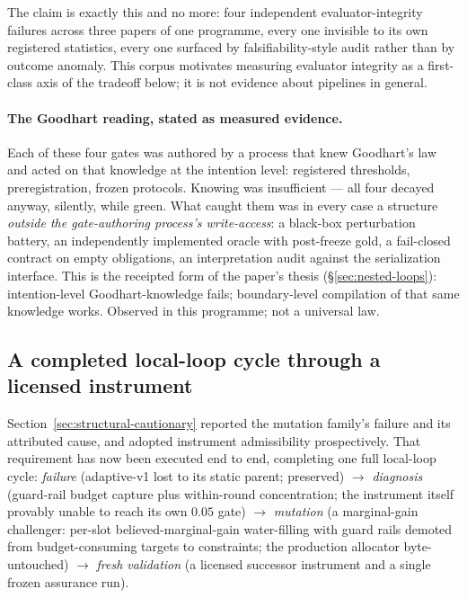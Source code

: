 The claim is exactly this and no more: four independent evaluator-integrity failures
across three papers of one programme, every one invisible to its own registered
statistics, every one surfaced by falsifiability-style audit rather than by outcome
anomaly. This corpus motivates measuring evaluator integrity as a first-class axis of
the tradeoff below; it is not evidence about pipelines in general.

\paragraph{The Goodhart reading, stated as measured evidence.}
Each of these four gates was authored by a process that knew Goodhart's law and acted
on that knowledge at the intention level: registered thresholds, preregistration,
frozen protocols. Knowing was insufficient --- all four decayed anyway, silently,
while green. What caught them was in every case a structure \emph{outside the
gate-authoring process's write-access}: a black-box perturbation battery, an
independently implemented oracle with post-freeze gold, a fail-closed contract on
empty obligations, an interpretation audit against the serialization interface. This
is the receipted form of the paper's thesis (\S\ref{sec:nested-loops}):
intention-level Goodhart-knowledge fails; boundary-level compilation of that same
knowledge works. Observed in this programme; not a universal law.

\subsection{A completed local-loop cycle through a licensed instrument}
\label{sec:local-cycle}

Section~\ref{sec:structural-cautionary} reported the mutation family's failure and its
attributed cause, and adopted instrument admissibility prospectively. That requirement
has now been executed end to end, completing one full local-loop cycle:
\emph{failure} (adaptive-v1 lost to its static parent; preserved) $\to$
\emph{diagnosis} (guard-rail budget capture plus within-round concentration; the
instrument itself provably unable to reach its own $0.05$ gate) $\to$ \emph{mutation}
(a marginal-gain challenger: per-slot believed-marginal-gain water-filling with guard
rails demoted from budget-consuming targets to constraints; the production allocator
byte-untouched) $\to$ \emph{fresh validation} (a licensed successor instrument and a
single frozen assurance run).

